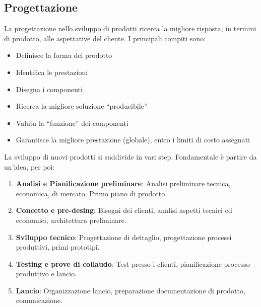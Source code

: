 \subsection{Progettazione}
La progettazione nello sviluppo di prodotti ricerca la migliore risposta, in termini di prodotto, alle aspettative del cliente. I principali compiti sono:
\begin{itemize}
	\item Definisce la forma del prodotto
	\item Identifica le prestazioni
	\item Disegna i componenti
	\item Ricerca la migliore soluzione “producibile”
	\item Valuta la “funzione” dei componenti
	\item Garantisce la migliore prestazione (globale), entro i limiti di costo assegnati
\end{itemize}

La sviluppo di nuovi prodotti si suddivide in vari step. Fondamentale è partire da un'idea, per poi:
\begin{enumerate}
	\item \textbf{Analisi e Pianificazione preliminare}: Analisi preliminare tecnica, economica, di mercato. Primo piano di prodotto.
	\item \textbf{Concetto e pre-desing}: Bisogni dei clienti, analisi aspetti tecnici ed economici, architettura preliminare.
	\item \textbf{Sviluppo tecnico}: Progettazione di dettaglio, progettazione processi produttivi, primi prototipi.
	\item \textbf{Testing e prove di collaudo}: Test presso i clienti, pianificazione processo produttivo e lancio.
	\item \textbf{Lancio}: Organizzazione lancio, preparazione documentazione di prodotto, comunicazione.
\end{enumerate}
